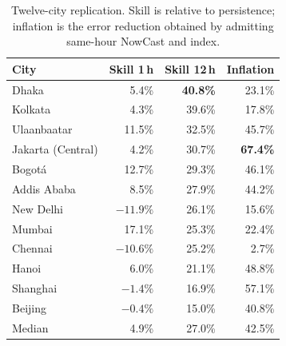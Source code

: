 \documentclass[conference,a4paper]{IEEEtran}
\begin{document}
\begin{table}[t]
\caption{Twelve-city replication. Skill is relative to persistence; inflation is
the error reduction obtained by admitting same-hour NowCast and index.}
\label{tab:cities_res}
\centering
\small
\begin{tabular}{@{}lrrr@{}}
\toprule
City & Skill 1\,h & Skill 12\,h & Inflation \\
\midrule
Dhaka             &   5.4\% & \textbf{40.8\%} & 23.1\% \\
Kolkata           &   4.3\% & 39.6\% & 17.8\% \\
Ulaanbaatar       &  11.5\% & 32.5\% & 45.7\% \\
Jakarta (Central) &   4.2\% & 30.7\% & \textbf{67.4\%} \\
Bogot\'a          &  12.7\% & 29.3\% & 46.1\% \\
Addis Ababa       &   8.5\% & 27.9\% & 44.2\% \\
New Delhi         & $-11.9\%$ & 26.1\% & 15.6\% \\
Mumbai            &  17.1\% & 25.3\% & 22.4\% \\
Chennai           & $-10.6\%$ & 25.2\% &  2.7\% \\
Hanoi             &   6.0\% & 21.1\% & 48.8\% \\
Shanghai          &  $-1.4\%$ & 16.9\% & 57.1\% \\
Beijing           &  $-0.4\%$ & 15.0\% & 40.8\% \\
\midrule
Median            &   4.9\% & 27.0\% & 42.5\% \\
\bottomrule
\end{tabular}
\end{table}
\end{document}
